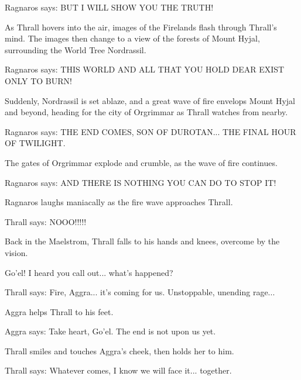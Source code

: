 Ragnaros says: BUT I WILL SHOW YOU THE TRUTH!

As Thrall hovers into the air, images of the Firelands flash through Thrall's mind. The images then change to a view of the forests of Mount Hyjal, surrounding the World Tree Nordrassil.

Ragnaros says: THIS WORLD AND ALL THAT YOU HOLD DEAR EXIST ONLY TO BURN!

Suddenly, Nordrassil is set ablaze, and a great wave of fire envelops Mount Hyjal and beyond, heading for the city of Orgrimmar as Thrall watches from nearby.

Ragnaros says: THE END COMES, SON OF DUROTAN... THE FINAL HOUR OF TWILIGHT.

The gates of Orgrimmar explode and crumble, as the wave of fire continues.

Ragnaros says: AND THERE IS NOTHING YOU CAN DO TO STOP IT!

Ragnaros laughs maniacally as the fire wave approaches Thrall.

Thrall says: NOOO!!!!!

Back in the Maelstrom, Thrall falls to his hands and knees, overcome by the vision.

Go'el! I heard you call out... what's happened?

Thrall says: Fire, Aggra... it's coming for us. Unstoppable, unending rage...

Aggra helps Thrall to his feet.

Aggra says: Take heart, Go'el. The end is not upon us yet.

Thrall smiles and touches Aggra's cheek, then holds her to him.

Thrall says: Whatever comes, I know we will face it... together.
